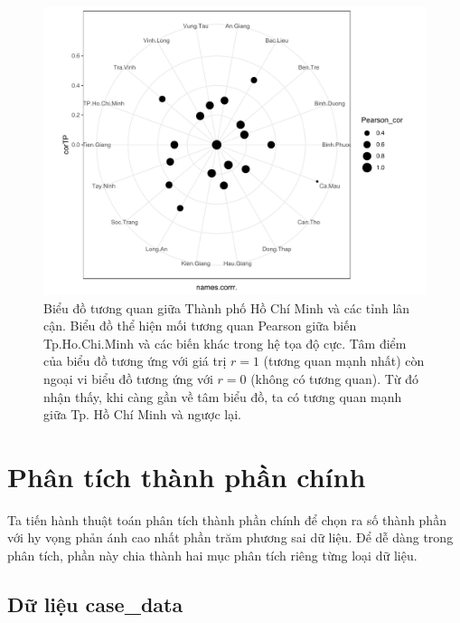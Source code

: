 \documentclass[../thesis.tex]{subfiles}
\begin{document}
\begin{figure}[H]
	\centering
	\includegraphics[width=0.7\linewidth]{images/Pearson}
	\caption[Biểu đồ tương quan giữa Thành phố Hồ Chí Minh và các tỉnh lân cận]{Biểu đồ tương quan giữa Thành phố Hồ Chí Minh và các tỉnh lân cận. Biểu đồ thể hiện mối tương quan Pearson giữa biến Tp.Ho.Chi.Minh và các biến khác trong hệ tọa độ cực. Tâm điểm của biểu đồ tương ứng với giá trị $ r=1 $ (tương quan mạnh nhất) còn ngoại vi biểu đồ tương ứng với $ r=0 $ (không có tương quan). Từ đó nhận thấy, khi càng gần về tâm biểu đồ, ta có tương quan mạnh giữa Tp. Hồ Chí Minh và ngược lại.}
	\label{fig:pearson}
\end{figure}










\newpage
\section{Phân tích thành phần chính}

Ta tiến hành thuật toán phân tích thành phần chính để chọn ra số thành phần với hy vọng phản ánh cao nhất phần trăm phương sai dữ liệu. Để dễ dàng trong phân tích, phần này chia thành hai mục phân tích riêng từng loại dữ liệu.



\subsection{Dữ liệu \textbf{\textsf{case\_data}}}
\begin{Shaded}
	\begin{Highlighting}[]
\SpecialCharTok{\%\textgreater{}\%}\SpecialCharTok{::}
		 \NormalTok{)}
	\end{Highlighting}
\end{Shaded}
\end{document}
